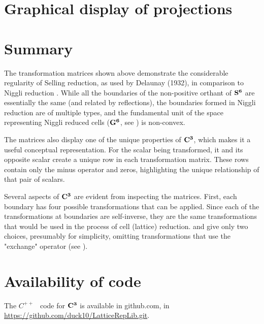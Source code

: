 \documentclass[preprint]{iucr}              %
\numberwithin{equation}{section}
\newcommand{\SVI}[0]{$\bf{S^{6}}$}
\newcommand{\GVI}[0]{$\bf{G^{6}}$}
\newcommand{\CIII}[0]{$\bf{C^{3}}$}
\begin{document}
	
	\section{Graphical display of projections}
	
	
	
	
	
	\section{Summary}
	
The transformation matrices shown above demonstrate the 
considerable regularity of Selling reduction, as used by 
Delaunay (1932), in comparison to Niggli 
reduction \cite{Niggli1928}. While all the boundaries of the non-positive 
orthant of \SVI{} are essentially the same (and 
related by reflections), the boundaries formed in 
Niggli reduction are of multiple types, and the fundamental unit 
of the space representing Niggli reduced cells (\GVI{}, see ) is non-convex.

The matrices also display one of the unique properties of \CIII{}, 
which makes it a useful conceptual representation. 
For the scalar being transformed, it and its opposite scalar
create a unique row in each transformation matrix. These rows contain only
the minus operator and zeros, highlighting the 
unique relationship of that pair of scalars.

Several aspects of \CIII{} are evident from inspecting the matrices. 
First, each boundary has four possible 
transformations that can be applied. Since each of 
the transformations at boundaries are self-inverse, they are the 
same transformations that would be used in the process of 
cell (lattice) reduction.  and  give only two choices, presumably for simplicity, 
omitting transformations that use the "exchange" operator 
(see ).

	
	
	
	
	
	\section{Availability of code}
	
	The $C^{++}$ ~code for \CIII{} is available in github.com, in
	\url{https://github.com/duck10/LatticeRepLib.git}.
	
\end{document}
